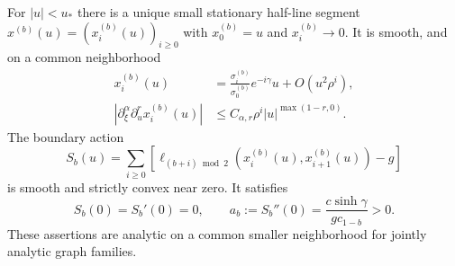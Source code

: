 \begin{lemma}\label{lem:v4-halfline}
For $|u|<u_*$ there is a unique small stationary half-line segment
$x^{(b)}(u)=(x_i^{(b)}(u))_{i\ge0}$ with $x_0^{(b)}=u$ and
$x_i^{(b)}\to0$. It is smooth, and on a common neighborhood
\begin{equation}\label{eq:v4-half-estimate}
 \begin{split}
 x_i^{(b)}(u)&=\frac{\sigma_i^{(b)}}{\sigma_0^{(b)}}
                      e^{-i\gamma}u+O(u^2\rho^i),\\
 |\partial_\xi^\alpha\partial_u^r x_i^{(b)}(u)|
                  &\le C_{\alpha,r}\rho^i
                     |u|^{\max(1-r,0)}.
 \end{split}
\end{equation}
The boundary action
\begin{equation}\label{eq:v4-boundary-action}
 S_b(u)=\sum_{i\ge0}
  \left[\ell_{(b+i)\bmod2}(x_i^{(b)}(u),x_{i+1}^{(b)}(u))-g\right]
\end{equation}
is smooth and strictly convex near zero. It satisfies
\begin{equation}\label{eq:v4-boundary-hessian}
 S_b(0)=S_b'(0)=0,\qquad
 a_b:=S_b''(0)=\frac{c\sinh\gamma}{g c_{1-b}}>0.
\end{equation}
These assertions are analytic on a common smaller neighborhood for
jointly analytic graph families.
\end{lemma}
